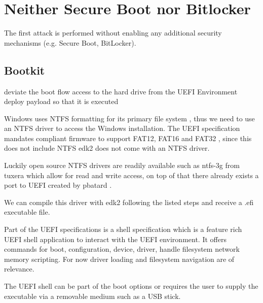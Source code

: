 
\section{Neither Secure Boot nor Bitlocker}

The first attack is performed without enabling any additional security mechanisms (e.g. Secure Boot, BitLocker).

\subsection{Bootkit}

deviate the boot flow
access to the hard drive from the UEFI Environment
deploy payload so that it is executed

Windows uses NTFS formatting for its primary file system \cite{microsoft-ntfs-overview}, thus we need to use an NTFS driver to access the Windows installation.
The UEFI specification mandates compliant firmware to support FAT12, FAT16 and FAT32 \cite[13.3.1.1]{uefi-spec}, since this does not include NTFS edk2 does not come with an NTFS driver.

Luckily open source NTFS drivers are readily available such as ntfs-3g from tuxera \cite{ntfs-3g} which allow for read and write access, on top of that there already exists a port to UEFI created by pbatard \cite{ntfs-3g-uefi}.

We can compile this driver with edk2 following the listed steps and receive a .efi executable file.

Part of the UEFI specifications is a shell specification which is a feature rich UEFI shell application to interact with the UEFI environment.
It offers commands for
boot,
configuration,
device, driver, handle
filesystem
network
memory
scripting.
For now driver loading and filesystem navigation are of relevance.

The UEFI shell can be part of the boot options or requires the user to supply the executable via a removable medium such as a USB stick.

